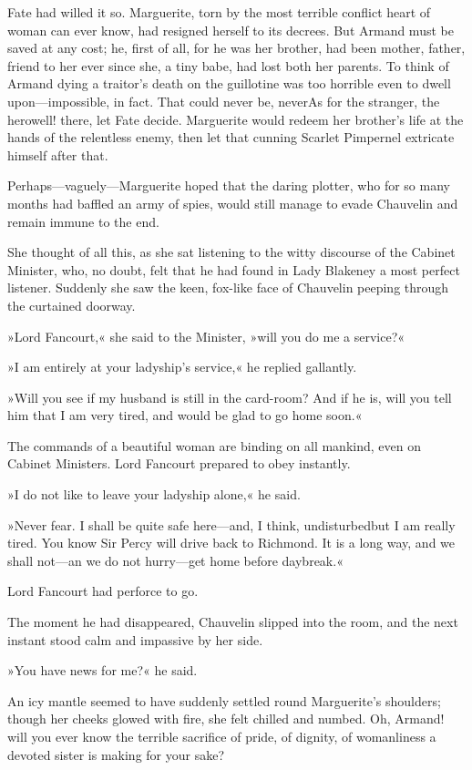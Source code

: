 Fate had willed it so. Marguerite, torn by the most terrible conflict heart of woman can ever know, had resigned herself to its decrees. But Armand must be saved at any cost; he, first of all, for he was her brother, had been mother, father, friend to her ever since she, a tiny babe, had lost both her parents. To think of Armand dying a traitor's death on the guillotine was too horrible even to dwell upon—impossible, in fact. That could never be, never\textellipsis \allowbreak  As for the stranger, the hero\textellipsis \allowbreak  well! there, let Fate decide. Marguerite would redeem her brother's life at the hands of the relentless enemy, then let that cunning Scarlet Pimpernel extricate himself after that.

Perhaps—vaguely—Marguerite hoped that the daring plotter, who for so many months had baffled an army of spies, would still manage to evade Chauvelin and remain immune to the end.

She thought of all this, as she sat listening to the witty discourse of the Cabinet Minister, who, no doubt, felt that he had found in Lady Blakeney a most perfect listener. Suddenly she saw the keen, fox-like face of Chauvelin peeping through the curtained doorway.

»Lord Fancourt,« she said to the Minister, »will you do me a service?«

»I am entirely at your ladyship's service,« he replied gallantly.

»Will you see if my husband is still in the card-room? And if he is, will you tell him that I am very tired, and would be glad to go home soon.«

The commands of a beautiful woman are binding on all mankind, even on Cabinet Ministers. Lord Fancourt prepared to obey instantly.

»I do not like to leave your ladyship alone,« he said.

»Never fear. I shall be quite safe here—and, I think, undisturbed\textellipsis \allowbreak  but I am really tired. You know Sir Percy will drive back to Richmond. It is a long way, and we shall not—an we do not hurry—get home before daybreak.«

Lord Fancourt had perforce to go.

The moment he had disappeared, Chauvelin slipped into the room, and the next instant stood calm and impassive by her side.

»You have news for me?« he said.

An icy mantle seemed to have suddenly settled round Marguerite's shoulders; though her cheeks glowed with fire, she felt chilled and numbed. Oh, Armand! will you ever know the terrible sacrifice of pride, of dignity, of womanliness a devoted sister is making for your sake?

